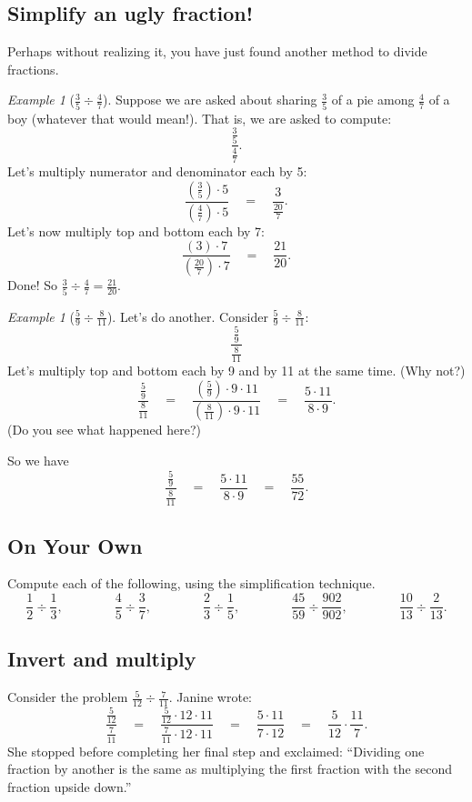 \documentclass[10pt, reqno]{amsart}
\theoremstyle{remark}
\newtheorem{example}[thm]{Example}
\theoremstyle{definition}
\numberwithin{equation}{section}  %
\begin{document}
\subsection{Simplify an ugly fraction!}
Perhaps without realizing it, you have just found another method to divide fractions.

\begin{example}[$\frac 35 \div \frac 47$]
Suppose we are  asked about sharing $\frac 3 5$
of a pie among $\frac 4 7$
of a boy (whatever that would mean!). That is,
we are  asked to compute:
\[
\frac{\frac 3 5}{\frac 4 7}.
\]
Let's multiply numerator and denominator each by 5:
\[
\frac{\left(\frac 3 5\right)\cdot5}{\left(\frac 4 7\right)\cdot 5}
\quad
=
\quad
\frac{3}{\frac{20}7}.
\]
Let's now multiply top and bottom each by 7:
\[
\frac{\left(3\right)\cdot 7}{\left(\frac{20}7\right)\cdot 7}
\quad
= 
\quad
\frac{21}{20}.
\]
Done!  So $\frac 3 5 \div \frac 4 7 = \frac {21}{20}$.
\end{example}


\begin{example}[$\frac 5 9 \div \frac 8{11}$]
Let's do another. Consider $\frac 5 9 \div \frac 8{11}$:
\[
\frac{\frac 59}{\frac 8{11}}
\]
Let's multiply top and bottom each by 9 and by 11 at the same time. (Why not?)
\[
\frac{\frac 59}{\frac 8{11}}
\quad
 =
 \quad
\frac{\left(\frac 59\right)\cdot9\cdot 11}{\left(\frac 8{11}\right) \cdot 9\cdot 11}
\quad
= 
\quad
\frac{5\cdot 11}{8\cdot 9}.
\]
(Do you see what happened here?)

So we have 
\[
\frac{\frac 59}{\frac 8{11}}
\quad
=
\quad
\frac{5\cdot 11}{8\cdot9}
\quad
 = 
 \quad
 \frac {55}{72}.
\]
\end{example}



\subsection*{On Your Own}
Compute each of the following, using the simplification technique.
\[
\frac 12 \div \frac 1 3,
\qquad\qquad
\frac 4 5 \div \frac 3 7,
\qquad\qquad
\frac 2 3 \div \frac 1 5,
\qquad\qquad
\frac {45}{59} \div \frac {902}{902},
\qquad\qquad
\frac{10}{13} \div \frac{2}{13}.
\]



\subsection{Invert and multiply}
Consider the problem
$\frac 5 {12} \div \frac 7 {11}$.
Janine wrote:
\[
\frac{\frac 5 {12} }{ \frac 7 {11}} 
\quad
= 
\quad
\frac{\frac 5 {12} \cdot 12\cdot 11}{ \frac 7 {11} \cdot 12 \cdot 11} 
\quad
= 
\quad
\frac{ 5 \cdot 11 }{  7\cdot 12} 
\quad
=
\quad
\frac 5{12} \cdot \frac{11} 7.
\]
She stopped before completing her final step and  exclaimed: 
``Dividing one fraction by another is the same as multiplying
the first fraction with the second fraction upside down.''
\end{document}
